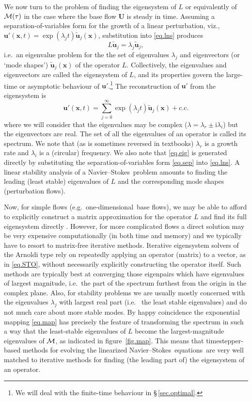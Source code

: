 \documentclass[11pt,a4paper]{report}
\newcommand\ci{\mathrm{i}}
\newcommand\wt[1]{\widetilde{#1}}
\newcommand\NavSto{Navier--Stokes}
\newcommand\LNS{linearized \NavSto}
\newcommand\LNSE{\LNS\ equations}
\newcommand\oned{one-di\-men\-sion\-al}
\newcommand{\ie}{i.e.\ }
\newcommand{\eg}{e.g.\ }
\newcommand\Ubase{{\bm{U}}}
\newcommand\upert{{\bm{u}'}}
\newcommand\xvec{\bm{x}}
\newcommand\Lop{{L}}
\newcommand\Mop{{\cal M}}
\begin{document}
We now turn to the problem of finding the eigensystem of $\Lop$ or
equivalently of $\Mop(\tau)$ in the case where the base flow $\Ubase$
is steady in time.  Assuming a separation-of-variables form for the
growth of a linear perturbation, viz.,
$\upert(\xvec,t)=\exp(\lambda_jt)\wt{\bm{u}}_j(\xvec)$, substitution
into \eqref{eq.lns} produces
\begin{equation}
\Lop \wt{\bm{u}}_j = \lambda_j \wt{\bm{u}}_j,
\label{eq.eig}
\end{equation}
\ie an eigenvalue problem for the the set of eigenvalues $\lambda_j$
and eigenvectors (or `mode shapes') $\wt{\bm{u}}_j(\xvec)$ of the
operator $\Lop$.  Collectively, the eigenvalues and eigenvectors are
called the eigensystem of $\Lop$, and its properties govern the
large-time or asymptotic behaviour of $\upert$.\footnote{We will deal
  with the finite-time behaviour in \S\,\ref{sec.optimal}.} The
reconstruction of $\upert$ from the eigensystem is
\begin{equation}
\upert(\xvec, t) = \sum_{j=0}^\infty
\exp(\lambda_j t)\wt{\bm{u}}_j(\xvec) +\text{c.c.}
\label{eq.sep}
\end{equation}
where we will consider that the eigenvalues may be complex
($\lambda=\lambda_r\pm\ci\lambda_i$) but the eigenvectors are real. The
set of all the eigenvalues of an operator is called its spectrum. We
note that (as is sometimes reversed in textbooks) $\lambda_r$ is a
growth rate and $\lambda_i$ is a (circular) frequency.  We also note
that \eqref{eq.eig} is generated directly by substituting the
separation-of-variables form \eqref{eq.sep} into \eqref{eq.lns}. A
linear stability analysis of a \NavSto\ problem amounts to finding the
leading (least stable) eigenvalues of $\Lop$ and the corresponding
mode shapes (perturbation flows).

Now, for simple flows (\eg \oned\ base flows), we may be able to
afford to explicitly construct a matrix approximation for the operator
$\Lop$ and find its full eigensystem directly \citep[see \eg appendix
  A of][]{schmid01}. However, for more complicated flows a direct
solution may be very expensive computationally (in both time and
memory) and we typically have to resort to matrix-free iterative
methods.  Iterative eigensystem solvers of the Arnoldi type
\citep{saad92} rely on repeatedly applying an operator (matrix) to a
vector, as in \eqref{eq.STO}, without necessarily explicitly
constructing the operator itself. Such methods are typically best at
converging those eigenpairs which have eigenvalues of largest
magnitude, \ie the part of the spectrum furthest from the origin in
the complex plane.  Also, for stability problems we are usually mostly
concerned with the eigenvalues $\lambda_j$ with largest real part (\ie
the least stable eigenvalues) and do not much care about more stable
modes. By happy coincidence the exponential mapping \eqref{eq.map} has
precisely the feature of transforming the spectrum in such a way that
the least-stable eigenvalues of $\Lop$ become the largest-magnitude
eigenvalues of $\Mop$, as indicated in figure~\ref{fig.map}.  This
means that timestepper-based methods for evolving the \LNSE\ are very
well matched to iterative methods for finding (the leading part of)
the eigensystem of an operator.
\end{document}
